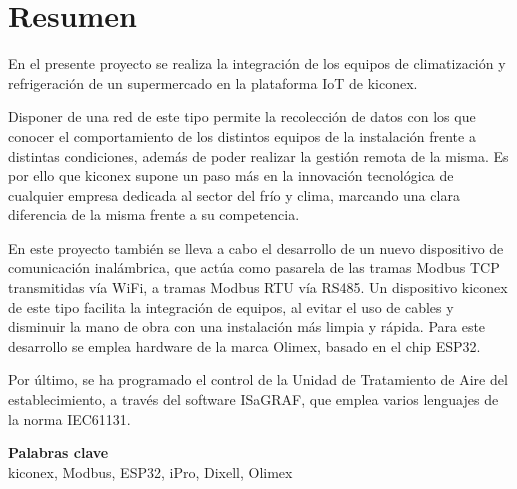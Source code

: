 \chapter*{Resumen}

En el presente proyecto se realiza la integración de los equipos de climatización y refrigeración de un supermercado en la plataforma IoT de kiconex.

Disponer de una red de este tipo permite la recolección de datos con los que conocer el comportamiento de los distintos equipos de la instalación frente a distintas condiciones, además de poder realizar la gestión remota de la misma. Es por ello que kiconex supone un paso más en la innovación tecnológica de cualquier empresa dedicada al sector del frío y clima, marcando una clara diferencia de la misma frente a su competencia.

En este proyecto también se lleva a cabo el desarrollo de un  nuevo dispositivo de comunicación inalámbrica, que actúa como pasarela de las tramas Modbus TCP transmitidas vía WiFi, a tramas Modbus RTU vía RS485. Un dispositivo kiconex de este tipo facilita la integración de equipos, al evitar el uso de cables y disminuir la mano de obra con una instalación más limpia y rápida. Para este desarrollo se emplea hardware de la marca Olimex, basado en el chip ESP32.

Por último, se ha programado el control de la Unidad de Tratamiento de Aire del establecimiento, a través del software ISaGRAF, que emplea varios lenguajes de la norma IEC61131. 



\vspace{10mm}

\begin{center}
\textbf{\Large{Palabras clave}} \\
\vspace{10mm}
kiconex, Modbus, ESP32, iPro, Dixell, Olimex 
\end{center}